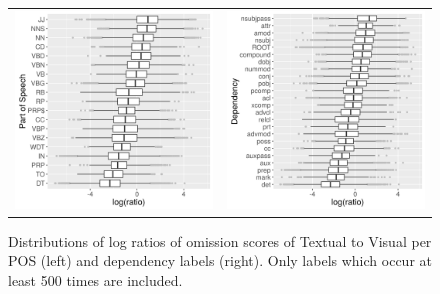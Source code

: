 \begin{figure}[t]
  \centering
  \hspace*{-0.2in}
  \setlength{\tabcolsep}{0pt}
  \begin{tabular}{cc}
  \includegraphics[scale=0.55]{imaginet-omission-ratio-pos-boxplot.png} &
  \includegraphics[scale=0.55]{imaginet-omission-ratio-dep-boxplot.png} \\  
  \end{tabular}
  \caption{Distributions of log ratios of omission scores of {\sc Textual} to {\sc Visual} per
    POS (left) and dependency labels (right). Only labels which occur at least 500 times are included.}
\label{fig:omission-imaginet-ratio}
\end{figure}

